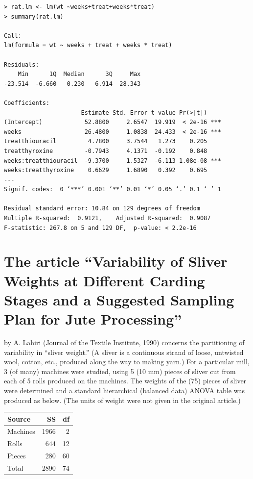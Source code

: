 \documentclass[11pt]{article}
\begin{document}
\begin{verbatim}
> rat.lm <- lm(wt ~weeks+treat+weeks*treat)
> summary(rat.lm)

Call:
lm(formula = wt ~ weeks + treat + weeks * treat)

Residuals:
    Min      1Q  Median      3Q     Max 
-23.514  -6.660   0.230   6.914  28.343 

Coefficients:
                      Estimate Std. Error t value Pr(>|t|)    
(Intercept)            52.8800     2.6547  19.919  < 2e-16 ***
weeks                  26.4800     1.0838  24.433  < 2e-16 ***
treatthiouracil         4.7800     3.7544   1.273    0.205    
treatthyroxine         -0.7943     4.1371  -0.192    0.848    
weeks:treatthiouracil  -9.3700     1.5327  -6.113 1.08e-08 ***
weeks:treatthyroxine    0.6629     1.6890   0.392    0.695    
---
Signif. codes:  0 ‘***’ 0.001 ‘**’ 0.01 ‘*’ 0.05 ‘.’ 0.1 ‘ ’ 1

Residual standard error: 10.84 on 129 degrees of freedom
Multiple R-squared:  0.9121,    Adjusted R-squared:  0.9087 
F-statistic: 267.8 on 5 and 129 DF,  p-value: < 2.2e-16
\end{verbatim}
\section{The article “Variability of Sliver Weights at Different Carding Stages and a Suggested Sampling Plan for Jute Processing”}
\label{sec-2}

by A. Lahiri (Journal of the Textile Institute, 1990) concerns the 
partitioning
of variability in “sliver weight.” (A sliver is a continuous strand
of loose, untwisted wool, cotton,
etc., produced along the way to making yarn.) For a particular mill, 
3 (of many) machines were
studied, using 5 (10 mm) pieces of sliver cut from each of 5 rolls produced on the machines. The
weights of the (75) pieces of sliver were determined and a standard hierarchical (balanced data)
ANOVA table was produced as below. (The units of weight were not given in the original article.)


\begin{center}
\begin{tabular}{lrr}
 Source    &    SS  &  df  \\
\hline
 Machines  &  1966  &   2  \\
 Rolls     &   644  &  12  \\
 Pieces    &   280  &  60  \\
\hline
 Total     &  2890  &  74  \\
\end{tabular}
\end{center}
\end{document}
